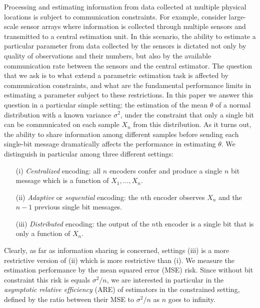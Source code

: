 \documentclass[letterpaper, conference]{IEEEtran}      %
\begin{document}
Processing and estimating information from data collected at multiple physical locations is subject to communication constraints. 
For example, consider large-scale sensor arrays where information is collected through multiple sensors and transmitted to a central estimation unit. In this scenario, the ability to estimate a particular parameter from data collected by the sensors is dictated not only by quality of observations and their numbers, but also by the available communication rate between the sensors and the central estimator. The question that we ask is to what extend a parametric estimation task is affected by communication constraints, and what are the fundamental performance limits in estimating a parameter subject to these restrictions. In this paper we answer this question in a particular simple setting: the estimation of the mean $\theta$ of a normal distribution with a known variance $\sigma^2$, under the constraint that only a single bit can be communicated on each sample $X_n$ from this distribution. As it turns out, the ability to share information among different samples before sending each single-bit message dramatically affects the performance in estimating $\theta$. We distinguish in particular among three different settings:
 \begin{itemize}
 \item[(i)] \emph{Centralized} encoding: all $n$ encoders confer and produce a single $n$ bit message which is a function of $X_1,\ldots,X_n$. 
 \item[(ii)] \emph{Adaptive} or \emph{sequential} encoding: the $n$th encoder observes $X_n$ and the $n-1$ previous single bit messages.
 \item[(iii)] \emph{Distributed} encoding: the output of the $n$th encoder is a single bit that is only a function of $X_n$.
 \end{itemize}
Clearly, as far as information sharing is concerned, settings (iii) is a more restrictive version of (ii) which is more restrictive than (i). We measure the estimation performance by the mean squared error (MSE) risk. Since without bit constraint this risk is equals $\sigma^2/n$, we are interested in particular in the \emph{asymptotic relative efficiency} (ARE) of estimators in the constrained setting, defined by the ratio between their MSE to $\sigma^2/n$ as $n$ goes to infinity. \\
\end{document}
